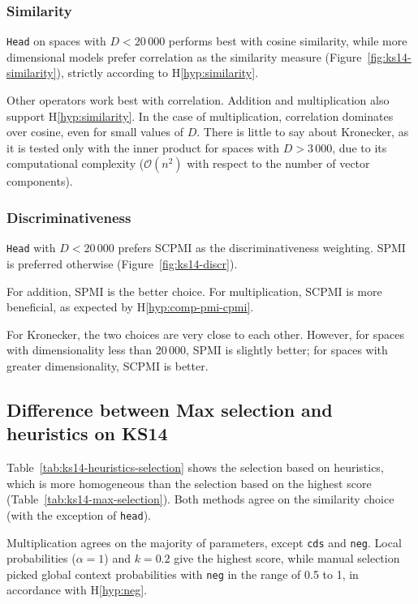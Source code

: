 \subsubsection{Similarity}
\texttt{Head} on spaces with $D < 20\,000$ performs best with cosine similarity, while more dimensional models prefer correlation as the similarity measure (Figure~\ref{fig:ks14-similarity}), strictly according to H\ref{hyp:similarity}.

Other operators work best with correlation. Addition and multiplication also support H\ref{hyp:similarity}. In the case of multiplication, correlation dominates over cosine, even for small values of $D$. There is little to say about Kronecker, as it is tested only with the inner product for spaces with $D > 3\,000$, due to its computational complexity ($\mathcal{O}(n^2)$ with respect to the number of vector components).

\subsubsection{Discriminativeness}


\texttt{Head} with $D < 20\,000$ prefers SCPMI as the discriminativeness weighting. SPMI is preferred otherwise (Figure~\ref{fig:ks14-discr}).

For addition, SPMI is the better choice. For multiplication, SCPMI is more beneficial, as expected by H\ref{hyp:comp-pmi-cpmi}.

For Kronecker, the two choices are very close to each other. However, for spaces with dimensionality less than 20\,000, SPMI is slightly better; for spaces with greater dimensionality, SCPMI is better.

\subsection{Difference between Max selection and heuristics on KS14}

Table~\ref{tab:ks14-heuristics-selection} shows the selection based on heuristics, which is more homogeneous than the selection based on the highest score (Table~\ref{tab:ks14-max-selection}). Both methods agree on the similarity choice (with the exception of \texttt{head}).

Multiplication agrees on the majority of parameters, except \texttt{cds} and \texttt{neg}. Local probabilities ($\alpha = 1$) and $k = 0.2$ give the highest score, while manual selection picked global context probabilities with \texttt{neg} in the range of 0.5 to 1, in accordance with H\ref{hyp:neg}.

